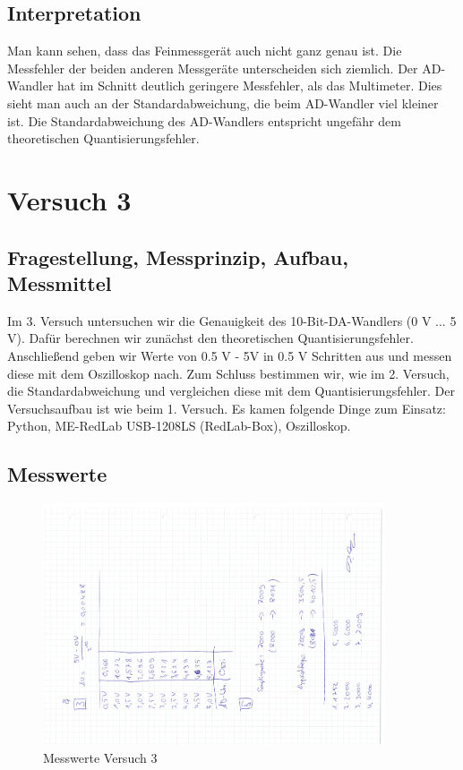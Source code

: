 \documentclass[12pt, oneside, a4paper, \docLanguage]{report}
\begin{document}
\section{Interpretation}
\label{chap:VERSUCH_2_INTERPRETATION}
\begin{normalsize}
Man kann sehen, dass das Feinmessgerät auch nicht ganz genau ist. Die Messfehler der beiden anderen Messgeräte unterscheiden sich ziemlich. Der AD-Wandler hat im Schnitt deutlich geringere Messfehler, als das Multimeter.
Dies sieht man auch an der Standardabweichung, die beim AD-Wandler viel kleiner ist. Die Standardabweichung des AD-Wandlers entspricht ungefähr dem theoretischen Quantisierungsfehler.
\end{normalsize}

%
%
\chapter{Versuch 3}
\label{chap:VERSUCH_3}

\section{Fragestellung, Messprinzip, Aufbau, Messmittel}
\label{chap:VERSUCH_3_FRAGESTELLUNG}
\begin{normalsize}
Im 3. Versuch untersuchen wir die Genauigkeit des 10-Bit-DA-Wandlers (0 V ... 5 V). Dafür berechnen wir zunächst den theoretischen Quantisierungsfehler. Anschließend geben wir Werte von 0.5 V - 5V in 0.5 V Schritten aus und
messen diese mit dem Oszilloskop nach. Zum Schluss bestimmen wir, wie im 2. Versuch, die Standardabweichung und vergleichen diese mit dem Quantisierungsfehler. Der Versuchsaufbau ist wie beim 1. Versuch. Es kamen folgende Dinge zum Einsatz: Python, ME-RedLab USB-1208LS (RedLab-Box), Oszilloskop.
\end{normalsize}

\section{Messwerte}
\label{chap:VERSUCH_3_MESSWERTE}
\begin{normalsize}
\begin{figure}[H]
	\centering
	\includegraphics[angle=270,width=0.9\textwidth]{../Messdaten3.pdf}
	\caption{Messwerte Versuch 3}
\end{figure}
\end{normalsize}
\end{document}

